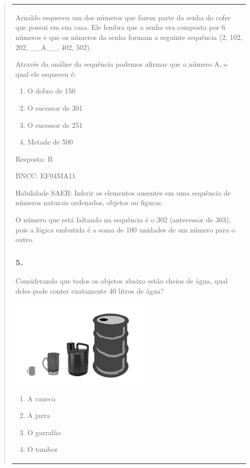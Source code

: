 \begin{enumerate}
\begin{escolha}
\begin{enumerate}
\begin{itemize}
\begin{itemize}
\begin{escolha}
\begin{quote}
\begin{escolha}
{\begin{longtable}[]{@{}l@{}}
\begin{itemize}
Arnaldo esqueceu um dos números que fazem parte da senha do cofre que
possui em sua casa. Ele lembra que a senha era composta por 6 números e
que os números da senha formam a seguinte sequência (2, 102, 202,
\_\_A\_\_, 402, 502).

Através da análise da sequência podemos afirmar que o número A, o qual
ele esqueceu é:

\begin{enumerate}
\def\labelenumi{\alph{enumi})}
\item
  O dobro de 150
\item
  O sucessor de 301
\item
  O sucessor de 251
\item
  Metade de 500
\end{enumerate}

Resposta: B

BNCC: EF04MA11

Habilidade SAEB: Inferir os elementos ausentes em uma sequência de
números naturais ordenados, objetos ou figuras.

O número que está faltando na sequência é o 302 (antecessor de 303),
pois a lógica embutida é a soma de 100 unidades de um número para o
outro.

\subsubsection{5. }\label{section-191}

Considerando que todos os objetos abaixo estão cheios de água, qual
deles pode conter exatamente 40 litros de água?

\includegraphics[width=2.78846in,height=1.67526in]{media/image166.png}

\begin{enumerate}
\def\labelenumi{\alph{enumi})}
\item
  A caneca
\item
  A jarra
\item
  O garrafão
\item
  O tambor
\end{enumerate}


\end{itemize}
\end{longtable}}
\end{escolha}
\end{quote}
\end{escolha}
\end{itemize}
\end{itemize}
\end{enumerate}
\end{escolha}
\end{enumerate}

